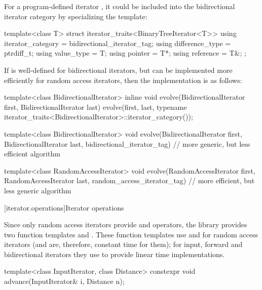 \pnum
\begin{example}
For a program-defined iterator
,
it could be included
into the bidirectional iterator category by specializing the
template:

\begin{codeblock}
template<class T> struct iterator_traits<BinaryTreeIterator<T>> {
  using iterator_category = bidirectional_iterator_tag;
  using difference_type   = ptrdiff_t;
  using value_type        = T;
  using pointer           = T*;
  using reference         = T&;
};
\end{codeblock}
\end{example}

\pnum
\begin{example}
If
is well-defined for bidirectional iterators, but can be implemented more
efficiently for random access iterators, then the implementation is as follows:

\begin{codeblock}
template<class BidirectionalIterator>
inline void
evolve(BidirectionalIterator first, BidirectionalIterator last) {
  evolve(first, last,
    typename iterator_traits<BidirectionalIterator>::iterator_category());
}

template<class BidirectionalIterator>
void evolve(BidirectionalIterator first, BidirectionalIterator last,
  bidirectional_iterator_tag) {
  // more generic, but less efficient algorithm
}

template<class RandomAccessIterator>
void evolve(RandomAccessIterator first, RandomAccessIterator last,
  random_access_iterator_tag) {
  // more efficient, but less generic algorithm
}
\end{codeblock}
\end{example}

[iterator.operations]{Iterator operations}

\pnum
Since only random access iterators provide
\tcode{+}
and
\tcode{-}
operators, the library provides two
function templates
and
.
These
function templates
use
\tcode{+}
and
\tcode{-}
for random access iterators (and are, therefore, constant
time for them); for input, forward and bidirectional iterators they use
\tcode{++}
to provide linear time
implementations.

%
\begin{itemdecl}
template<class InputIterator, class Distance>
  constexpr void advance(InputIterator& i, Distance n);
\end{itemdecl}

